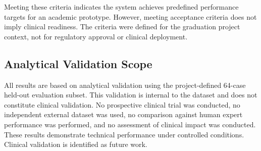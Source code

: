 Meeting these criteria indicates the system achieves predefined performance targets for an academic prototype. However, meeting acceptance criteria does not imply clinical readiness. The criteria were defined for the graduation project context, not for regulatory approval or clinical deployment.

\subsection{Analytical Validation Scope}

All results are based on analytical validation using the project-defined 64-case held-out evaluation subset. This validation is internal to the dataset and does not constitute clinical validation. No prospective clinical trial was conducted, no independent external dataset was used, no comparison against human expert performance was performed, and no assessment of clinical impact was conducted. These results demonstrate technical performance under controlled conditions. Clinical validation is identified as future work.
